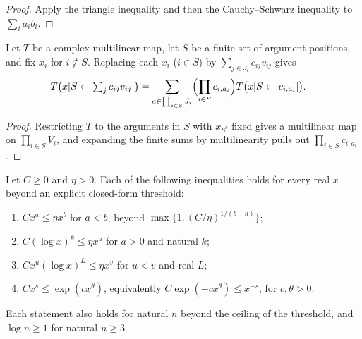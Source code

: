 \begin{proof}\leanok
    Apply the triangle inequality and then the Cauchy--Schwarz inequality to
    $\sum_ia_ib_i$.
\end{proof}

\begin{lemma}
    \label{thm:peps_selected_multilinear_expansion}
    \leanok
    Let $T$ be a complex multilinear map, let $S$ be a finite set of argument
    positions, and fix $x_i$ for $i\notin S$. Replacing each $x_i$
    ($i\in S$) by $\sum_{j\in J_i} c_{ij}v_{ij}$ gives
    \begin{align}
        T\bigl(x[S\leftarrow\textstyle\sum_j c_{ij}v_{ij}]\bigr)
         & =\sum_{a\in\prod_{i\in S}J_i}
        \Bigl(\prod_{i\in S}c_{i,a_i}\Bigr)
        T\bigl(x[S\leftarrow v_{i,a_i}]\bigr).
        \notag
    \end{align}
\end{lemma}

\begin{proof}\leanok
    Restricting $T$ to the arguments in $S$ with $x_{S^c}$ fixed gives a
    multilinear map on $\prod_{i\in S}V_i$, and expanding the finite sums by
    multilinearity pulls out $\prod_{i\in S}c_{i,a_i}$.
\end{proof}

\begin{lemma}
    \label{lem:explicit_thresholds}
    \leanok
    Let $C\ge0$ and $\eta>0$. Each of the following inequalities holds for
    every real $x$ beyond an explicit closed-form threshold:
    \begin{enumerate}
        \item $Cx^a\le\eta x^b$ for $a<b$, beyond
              $\max\{1,(C/\eta)^{1/(b-a)}\}$;
        \item $C(\log x)^k\le\eta x^a$ for $a>0$ and natural $k$;
        \item $Cx^u(\log x)^L\le\eta x^v$ for $u<v$ and real $L$;
        \item $Cx^s\le\exp(cx^\theta)$, equivalently
              $C\exp(-cx^\theta)\le x^{-s}$, for $c,\theta>0$.
    \end{enumerate}
    Each statement also holds for natural $n$ beyond the ceiling of the
    threshold, and $\log n\ge1$ for natural $n\ge3$.
\end{lemma}

